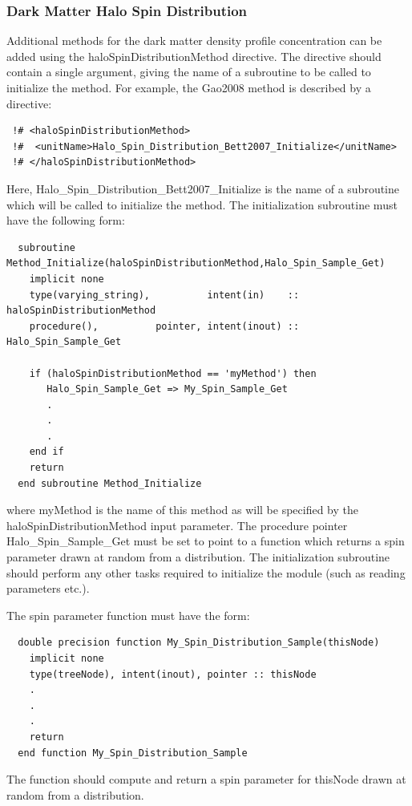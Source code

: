 \subsubsection{Dark Matter Halo Spin Distribution}\label{sec:HaloSpinDistribution}

Additional methods for the dark matter density profile concentration can be added using the {\normalfont \ttfamily haloSpinDistributionMethod} directive. The directive should contain a single argument, giving the name of a subroutine to be called to initialize the method. For example, the {\normalfont \ttfamily Gao2008} method is described by a directive:
\begin{verbatim}
 !# <haloSpinDistributionMethod>
 !#  <unitName>Halo_Spin_Distribution_Bett2007_Initialize</unitName>
 !# </haloSpinDistributionMethod>
\end{verbatim}
Here, {\normalfont \ttfamily Halo\_Spin\_Distribution\_Bett2007\_Initialize} is the name of a subroutine which will be called to initialize the method. The initialization subroutine must have the following form:
\begin{verbatim}
  subroutine Method_Initialize(haloSpinDistributionMethod,Halo_Spin_Sample_Get)
    implicit none
    type(varying_string),          intent(in)    :: haloSpinDistributionMethod
    procedure(),          pointer, intent(inout) :: Halo_Spin_Sample_Get
    
    if (haloSpinDistributionMethod == 'myMethod') then
       Halo_Spin_Sample_Get => My_Spin_Sample_Get
       .
       .
       .
    end if
    return
  end subroutine Method_Initialize
\end{verbatim}
where {\normalfont \ttfamily myMethod} is the name of this method as will be specified by the {\normalfont \ttfamily haloSpinDistributionMethod} input parameter. The procedure pointer {\normalfont \ttfamily Halo\_Spin\_Sample\_Get} must be set to point to a function which returns a spin parameter drawn at random from a distribution. The initialization subroutine should perform any other tasks required to initialize the module (such as reading parameters etc.).

The spin parameter function must have the form:
\begin{verbatim}
  double precision function My_Spin_Distribution_Sample(thisNode)
    implicit none
    type(treeNode), intent(inout), pointer :: thisNode
    .
    .
    .
    return
  end function My_Spin_Distribution_Sample
\end{verbatim}
The function should compute and return a spin parameter for {\normalfont \ttfamily thisNode} drawn at random from a distribution.

